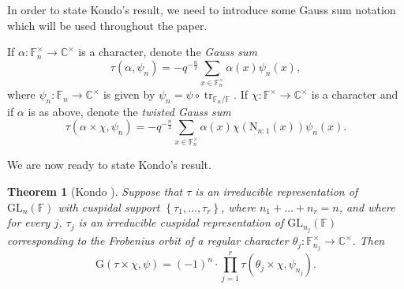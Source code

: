 \documentclass[12pt, reqno]{amsart}
\newtheorem{theorem}{Theorem}[section]
\theoremstyle{definition}
\theoremstyle{definition}
\theoremstyle{definition}
\newcommand{\cComplex}{\mathbb{C}}
\newcommand{\multiplicativegroup}[1]{#1^{\times}}
\newcommand{\fieldCharacter}{\psi}
\newcommand{\trace}{\operatorname{tr}}
\newcommand{\GL}{\mathrm{GL}}
\newcommand{\FieldNorm}[2]{\mathrm{N}_{#1:#2}}
\newcommand{\finiteField}{\mathbb{F}}
\newcommand{\finiteFieldExtension}[1]{\finiteField_{#1}}
\newcommand{\GaussSumScalar}[2]{\mathrm{G}\left(#1, #2\right)}
\newcommand{\GaussSumCharacter}[3]{\tau\left(#1 \times #2, #3\right)}
\begin{document}
In order to state Kondo's result, we need to introduce some Gauss sum notation which will be used throughout the paper.

If $\alpha \colon \multiplicativegroup{\finiteFieldExtension{n}} \to \multiplicativegroup{\cComplex}$ is a character, denote the \emph{Gauss sum} $$\tau\left(\alpha, \fieldCharacter_n\right) = -q^{-\frac{n}{2}}\sum_{x \in \multiplicativegroup{\finiteFieldExtension{n}}} \alpha\left(x\right) \fieldCharacter_n\left(x\right),$$where $\fieldCharacter_n \colon \finiteFieldExtension{n} \to \multiplicativegroup{\cComplex}$ is given by $\fieldCharacter_n = \fieldCharacter \circ \trace_{\finiteFieldExtension{n} \slash \finiteField}$. If $\chi \colon \multiplicativegroup{\finiteField} \to \multiplicativegroup{\cComplex}$ is a character and if $\alpha$ is as above, denote the \emph{twisted Gauss sum}
$$\tau\left(\alpha \times \chi, \fieldCharacter_n\right) = -q^{-\frac{n}{2}}\sum_{x \in \multiplicativegroup{\finiteFieldExtension{n}}} \alpha\left(x\right) \chi\left( \FieldNorm{n}{1}\left(x\right)\right) \fieldCharacter_n\left(x\right).$$

We are now ready to state Kondo's result.
\begin{theorem}[Kondo {\cite{Kondo1963}}]
	Suppose that $\tau$ is an irreducible representation of $\GL_n\left(\finiteField\right)$ with cuspidal support $\left\{\tau_1,\dots, \tau_r\right\}$, where $n_1 + \dots + n_r = n$, and where for every $j$, $\tau_j$ is an irreducible cuspidal representation of $\GL_{n_j}\left(\finiteField\right)$ corresponding to the Frobenius orbit of a regular character $\theta_j \colon \multiplicativegroup{\finiteFieldExtension{n_j}} \to \multiplicativegroup{\cComplex}$. Then
	$$\GaussSumScalar{\tau \times \chi}{\fieldCharacter} = \left(-1\right)^n \cdot \prod_{j=1}^r \GaussSumCharacter{\theta_j}{\chi}{\fieldCharacter_{n_j}}.$$
\end{theorem}
\end{document}
